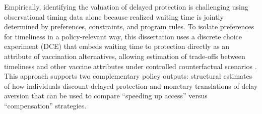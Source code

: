 Empirically, identifying the valuation of delayed protection is challenging using observational timing data alone because realized waiting time is jointly determined by preferences, constraints, and program rules. To isolate preferences for timeliness in a policy-relevant way, this dissertation uses a discrete choice experiment (DCE) that embeds waiting time to protection directly as an attribute of vaccination alternatives, allowing estimation of trade-offs between timeliness and other vaccine attributes under controlled counterfactual scenarios \citep{Louviere2000, Train2009, DCEreview2025}. This approach supports two complementary policy outputs: structural estimates of how individuals discount delayed protection and monetary translations of delay aversion that can be used to compare ``speeding up access'' versus ``compensation'' strategies.
